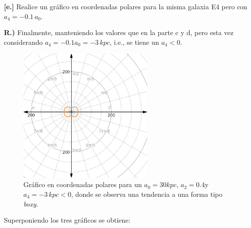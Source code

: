 \documentclass[paper=a4, fontsize=10pt]{scrartcl} %
\begin{document}
\newpage 

{\bf{[e.]}} Realice un gráfico en coordenadas polares para la misma galaxia E4 pero con $a_4 = -0.1\,a_0$.


\vspace{0.3cm} 

{\bf{R.)}} Finalmente, manteniendo los valores que en la parte c y d, pero esta vez considerando $a_4 = -0.1a_0 = -3 \, kpc$, i.e., se tiene un $a_4 < 0$.

\begin{figure}[h]
\begin{center}
\includegraphics[width=0.6\textwidth]{graf_e_con_lineas}
\caption{\small{Gráfico en coordenadas polares para un $a_0 = 30 kpc$, $a_2 = 0.4$y $a_4 = -3 \, kpc < 0$, donde se observa una tendencia a una forma tipo {\textit{boxy}}. }}
\label{fig:1.3} 
\end{center}
\end{figure}

\newpage 

Superponiendo los tres gráficos se obtiene: 
\end{document}
